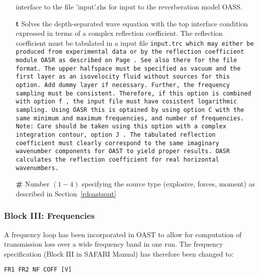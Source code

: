 \begin{itemize}
          interface  to  the file 'input'.rhs for  input  to  the 
          reverberation model OASS.
    \item[{\bf t}] Solves the depth-separated wave equation with the
top  interface condition expressed in terms of a complex
reflection coefficient. The reflection coefficient must be tabulated in a input file \tt input.trc \rm
which may either be produced from experimental data or by the
reflection coefficient module \tt OASR \rm as described on
Page\,\pageref{trc-form}. See also there for the file format.
The upper halfspace must be specified as vacuum and the first layer as
an isovelocity fluid without sources for this option. Add dummy layer
if necessary. Further, the
frequency sampling must be consistent. Therefore, if this option is
combined with option \tt f \rm, the input file must have cosistent logarithmic
sampling. Using \tt OASR \rm this is optained by using option \tt C
\rm with the same minimum and maximum frequencies, and number of frequencies.
Note: Care should be taken using this option with a complex
integration contour, option \tt J \rm. The tabulated reflection
coefficient must clearly correspond to the same imaginary wavenumber
components for \tt OAST \rm to yield proper results. \tt OASR \rm calculates
the reflection coefficient for real horizontal wavenumbers.
    \item[{\bf \#}] Number $(1-4)$ specifying the source type
       (explosive, forces, moment) as described in Section~\ref{rdoastsout}  
\end{itemize}

\subsubsection{Block III: Frequencies}

A frequency loop has been incorporated in OAST to allow for computation
of transmission loss over a wide frequency band in one run. The frequency
specification (Block III in SAFARI Manual) has therefore been changed to:

\begin{verbatim}
FR1 FR2 NF COFF [V]
\end{verbatim}


